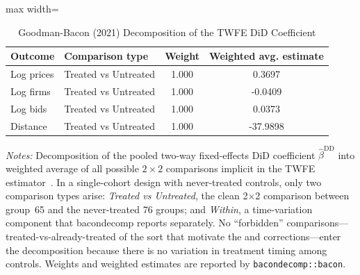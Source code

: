 \begin{table}[htbp]
\centering
\caption{Goodman-Bacon (2021) Decomposition of the TWFE DiD Coefficient}
\label{tab:bacon}
\begin{adjustbox}{max width=\textwidth}
\begin{threeparttable}
\small
\begin{tabular}{llcc}
\toprule
Outcome & Comparison type & Weight & Weighted avg. estimate \\
\midrule
Log prices & Treated vs Untreated & 1.000 & 0.3697 \\
Log firms & Treated vs Untreated & 1.000 & -0.0409 \\
Log bids & Treated vs Untreated & 1.000 & 0.0373 \\
Distance & Treated vs Untreated & 1.000 & -37.9898 \\
\bottomrule
\end{tabular}
\begin{tablenotes}
\small
\item \textit{Notes:} Decomposition of the pooled two-way fixed-effects
DiD coefficient $\hat\beta^{\mathrm{DD}}$ into weighted average of all
possible $2{\times}2$ comparisons implicit in the TWFE estimator~\citep{goodmanbacon2021}.
In a single-cohort design with never-treated controls, only two comparison types arise:
\textit{Treated vs Untreated}, the clean 2$\times$2 comparison between group~65 and the
never-treated 76 groups; and \textit{Within}, a time-variation component
that bacondecomp reports separately. No ``forbidden'' comparisons---treated-vs-already-treated
of the sort that motivate the \citet{callaway2021} and \citet{sun2021} corrections---enter
the decomposition because there is no variation in treatment timing among controls.
Weights and weighted estimates are reported by \texttt{bacondecomp::bacon}.
\end{tablenotes}
\end{threeparttable}
\end{adjustbox}
\end{table}

